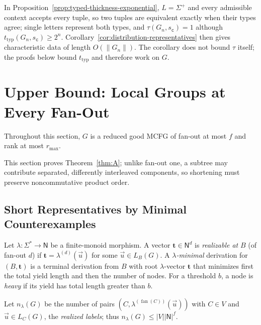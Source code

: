 \documentclass[11pt]{article}
\numberwithin{equation}{section}
\theoremstyle{plain}
\theoremstyle{definition}
\theoremstyle{remark}
\newcommand{\tuple}[1]{\vec{#1}}
\newcommand{\fan}{\operatorname{fan}}
\theoremstyle{plain}
\begin{document}
In Proposition~\ref{prop:typed-thickness-exponential}, $L=\Sigma^+$ and every
admissible context accepts every tuple, so two tuples are equivalent exactly
when their types agree; single letters represent both types, and
$\tau(G_n,s_{\mathtt c})=1$ although $t_{\mathrm{typ}}(G_n,s_{\mathtt c})\ge2^n$.
Corollary~\ref{cor:distribution-representatives} then gives characteristic
data of length $O(\|G_n\|)$.  The corollary does not bound $\tau$ itself; the
proofs below bound $t_{\mathrm{typ}}$ and therefore work on $G$.

\section{Upper Bound: Local Groups at Every Fan-Out}
\label{sec:upper}

Throughout this section, $G$ is a reduced good MCFG of
fan-out at most $f$ and rank at most $r_{\max}$.

This section proves Theorem~\ref{thm:A}; unlike fan-out one,
a subtree may contribute separated, differently interleaved
components, so shortening must preserve noncommutative product order.

\subsection{Short Representatives by Minimal Counterexamples}
\label{subsec:group-invariants}

Let $\lambda:\Sigma^*\to\mathsf N$ be a finite-monoid morphism.  A vector
$\mathbf t\in\mathsf N^d$ is \emph{realizable at} $B$ (of fan-out $d$) if
$\mathbf t=\lambda^{(d)}(\tuple u)$ for some $\tuple u\in L_B(G)$.  A
\emph{$\lambda$-minimal} derivation for $(B,\mathbf t)$ is a terminal derivation
from $B$ with root $\lambda$-vector $\mathbf t$ that minimizes first the total
yield length and then the number of nodes.  For a threshold $b$, a node is
\emph{heavy} if its yield has total length greater than $b$.

Let $n_\lambda(G)$ be the number of pairs $(C,\lambda^{(\fan(C))}(\tuple u))$ with $C\in V$ and
$\tuple u\in L_C(G)$, the \emph{realized labels}; thus $n_\lambda(G)\le|V||\mathsf N|^f$.
\end{document}
